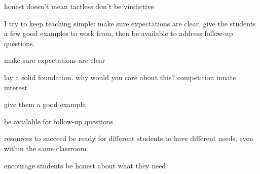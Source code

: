 \documentclass[12pt,letterpaper]{article}
\begin{document}
honest doesn't mean tactless
don't be vindictive


I try to keep teaching simple: make sure expectations are clear, give the students a few good examples to work from, then be available to address follow-up questions.


make sure expectations are clear

lay a solid foundation. why would you care about this?
competition
innate interest

give them a good example

be available for follow-up questions


resources to succeed
be ready for different students to have different needs, even within the same classroom

encourage students be honest about what they need







\end{document}
